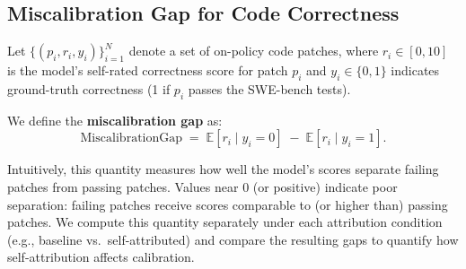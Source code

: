 \subsection{Miscalibration Gap for Code Correctness}

Let $\{(p_i, r_i, y_i)\}_{i=1}^N$ denote a set of on-policy code patches, where
$r_i \in [0,10]$ is the model's self-rated correctness score for patch $p_i$ and
$y_i \in \{0,1\}$ indicates ground-truth correctness (1 if $p_i$ passes the SWE-bench tests).

We define the \textbf{miscalibration gap} as:
\begin{equation}
\mathrm{MiscalibrationGap}
\;=\;
\mathbb{E}[r_i \mid y_i = 0]
\;-\;
\mathbb{E}[r_i \mid y_i = 1].
\end{equation}

Intuitively, this quantity measures how well the model's scores separate failing patches from
passing patches. Values near $0$ (or positive) indicate poor separation: failing patches receive
scores comparable to (or higher than) passing patches.
We compute this quantity separately under each attribution condition (e.g., baseline vs.\ self-attributed)
and compare the resulting gaps to quantify how self-attribution affects calibration.
